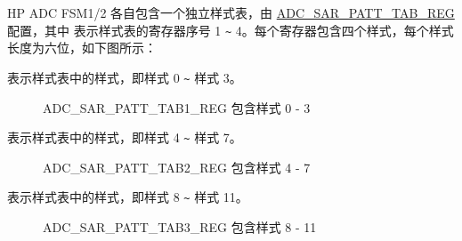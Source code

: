 \documentclass[main\_\_CN.tex]{subfiles}
\begin{document}
HP ADC FSM1/2 各自包含一个独立样式表，由 \hyperref[regdesc:ADCSAR1PATTTAB1REG]{ADC\_SAR\_PATT\_TAB\_REG} 配置，其中  表示样式表的寄存器序号 1 \verb+~+ 4。每个寄存器包含四个样式，每个样式长度为六位，如下图所示：

%
%
%
%
%
\begin{regdesc}\begin{reglist}
\item [cmd \regindex{n} (\regindex{n} = 0 - 3)] 表示样式表中的样式，即样式 0 \verb+~+ 样式 3。
\end{reglist}\end{regdesc}
\vspace{-2em}
\begin{figure}[H]
    \centering
    \caption{ADC\_SAR\_PATT\_TAB1\_REG 包含样式 0 - 3}
    \label{fig:pattern-tab-1}
\end{figure}

%
%
%
%
%
\begin{regdesc}\begin{reglist}
\item [cmd \regindex{n} (\regindex{n} = 4 - 7)] 表示样式表中的样式，即样式 4 \verb+~+ 样式 7。
\end{reglist}\end{regdesc}
\vspace{-2em}
\begin{figure}[H]
    \centering
    \caption{ADC\_SAR\_PATT\_TAB2\_REG 包含样式 4 - 7}
    \label{fig:pattern-tab-2}
\end{figure}

%
%
%
%
%
\begin{regdesc}\begin{reglist}
\item [cmd \regindex{n} (\regindex{n} = 8 - 11)] 表示样式表中的样式，即样式 8 \verb+~+ 样式 11。
\end{reglist}\end{regdesc}
\vspace{-2em}
\begin{figure}[H]
    \centering
    \caption{ADC\_SAR\_PATT\_TAB3\_REG 包含样式 8 - 11}
    \label{fig:pattern-tab-3}
\end{figure}
\end{document}
